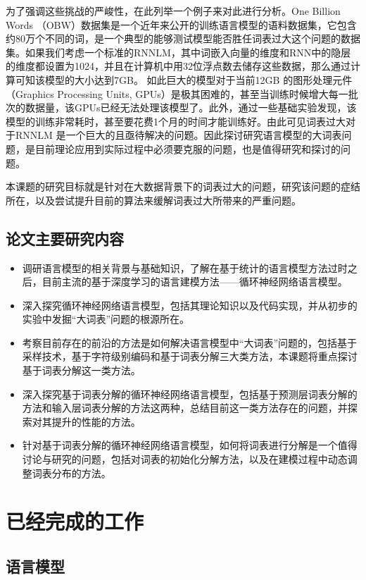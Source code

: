 \documentclass[12pt,a4paper]{article}
\begin{document}
为了强调这些挑战的严峻性，在此列举一个例子来对此进行分析。One Billion Words （OBW）数据集是一个近年来公开的训练语言模型的语料数据集，它包含约80万个不同的词，是一个典型的能够测试模型能否胜任词表过大这个问题的数据集。如果我们考虑一个标准的RNNLM，其中词嵌入向量的维度和RNN中的隐层的维度都设置为1024，并且在计算机中用32位浮点数去储存这些数据，那么通过计算可知该模型的大小达到7GB。 如此巨大的模型对于当前12GB 的图形处理元件（Graphics Processing Units, GPUs）是极其困难的，甚至当训练时候增大每一批次的数据量，该GPUs已经无法处理该模型了。此外，通过一些基础实验发现，该模型的训练非常耗时，甚至要花费1个月的时间才能训练好。由此可见词表过大对于RNNLM 是一个巨大的且亟待解决的问题。因此探讨研究语言模型的大词表问题，是目前理论应用到实际过程中必须要克服的问题，也是值得研究和探讨的问题。

本课题的研究目标就是针对在大数据背景下的词表过大的问题，研究该问题的症结所在，以及尝试提升目前的算法来缓解词表过大所带来的严重问题。

\subsection{论文主要研究内容}

\begin{itemize}
  \item 调研语言模型的相关背景与基础知识，了解在基于统计的语言模型方法过时之后，目前主流的基于深度学习的语言建模方法——循环神经网络语言模型。
  \item 深入探究循环神经网络语言模型，包括其理论知识以及代码实现，并从初步的实验中发掘“大词表”问题的根源所在。
  \item 考察目前存在的前沿的方法是如何解决语言模型中“大词表”问题的，包括基于采样技术，基于字符级别编码和基于词表分解三大类方法，本课题将重点探讨基于词表分解这一类方法。
  \item 深入探究基于词表分解的循环神经网络语言模型，包括基于预测层词表分解的方法和输入层词表分解的方法这两种，总结目前这一类方法存在的问题，并探索对其提升的性能的方法。
  \item 针对基于词表分解的循环神经网络语言模型，如何将词表进行分解是一个值得讨论与研究的问题，包括对词表的初始化分解方法，以及在建模过程中动态调整词表分布的方法。
\end{itemize}




\section{已经完成的工作}

\subsection{语言模型}
\end{document}
